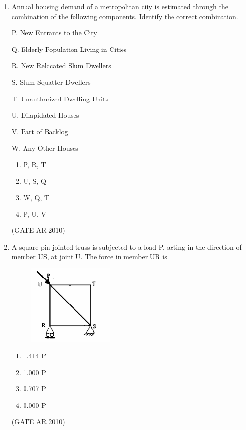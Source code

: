 \documentclass[journal]{IEEEtran}
\begin{document}
\begin{enumerate}
V. Emergence of New Islands
\begin{multicols}{4}
\begin{enumerate}
\item P, Q, R, S
\item Q, R, T, U
\item R, T, U, V
\item Q, R, U, V
\end{enumerate}
\end{multicols}
\hfill (GATE AR 2010)

\item Annual housing demand of a metropolitan city is estimated through the combination of the following components. Identify the correct combination.

P. New Entrants to the City

Q. Elderly Population Living in Cities

R. New Relocated Slum Dwellers

S. Slum Squatter Dwellers

T. Unauthorized Dwelling Units

U. Dilapidated Houses

V. Part of Backlog

W. Any Other Houses
\begin{multicols}{4}
\begin{enumerate}
\item P, R, T
\item U, S, Q
\item W, Q, T
\item P, U, V
\end{enumerate}
\end{multicols}
\hfill (GATE AR 2010)

\item A square pin jointed truss is subjected to a load P, acting in the direction of member US, at joint U. The force in member UR is
\begin{figure}[H]
\centering
\includegraphics[width=0.4\textwidth]{Fig 5.png}
\caption{}
\label{fig:question32}
\end{figure}
\begin{multicols}{4}
\begin{enumerate}
\item 1.414 P
\item 1.000 P
\item 0.707 P
\item 0.000 P
\end{enumerate}
\end{multicols}
\hfill (GATE AR 2010)


\end{enumerate}
\end{document}
